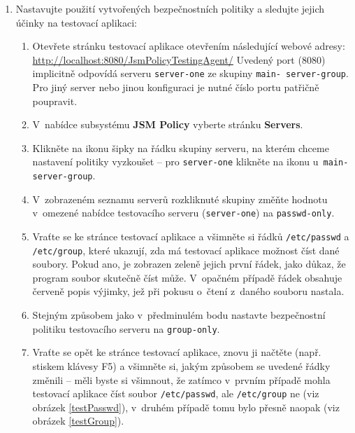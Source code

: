 \begin{enumerate}
  \item Nastavujte použití vytvořených bezpečnostních politiky a sledujte jejich účinky na testovací aplikaci:
  \begin{enumerate}
    \item Otevřete stránku testovací aplikace otevřením následující webové adresy:
      \newline\url{http://localhost:8080/JsmPolicyTestingAgent/}\newline
      Uvedený port (8080) implicitně odpovídá serveru {\tt server-one} ze skupiny {\tt main- server-group}. Pro jiný server nebo jinou konfiguraci je nutné číslo portu patřičně poupravit.
    \item V~nabídce subsystému {\bf JSM Policy} vyberte stránku {\bf Servers}.
    \item Klikněte na ikonu šipky na řádku skupiny serveru, na kterém chceme nastavení politiky vyzkoušet -- pro {\tt server-one} klikněte na ikonu u~{\tt main-server-group}.
    \item V~zobrazeném seznamu serverů rozkliknuté skupiny změňte hodnotu v~omezené nabídce testovacího serveru ({\tt server-one}) na {\tt passwd-only}.
    \item Vraťte se ke stránce testovací aplikace a všimněte si řádků {\tt /etc/passwd} a {\tt /etc/group}, které ukazují, zda má testovací aplikace možnost číst dané soubory. Pokud ano, je zobrazen zeleně jejich první řádek, jako důkaz, že program soubor skutečně číst může. V~opačném případě řádek obsahuje červeně popis výjimky, jež při pokusu o~čtení z~daného souboru nastala.
    \item Stejným způsobem jako v~předminulém bodu nastavte bezpečnostní politiku testovacího serveru na {\tt group-only}.
    \item Vraťte se opět ke stránce testovací aplikace, znovu ji načtěte (např. stiskem klávesy F5) a všimněte si, jakým způsobem se uvedené řádky změnili -- měli byste si všimnout, že zatímco v~prvním případě mohla testovací aplikace číst soubor {\tt /etc/passwd}, ale {\tt /etc/group} ne (viz obrázek \ref{testPasswd}), v~druhém případě tomu bylo přesně naopak (viz obrázek \ref{testGroup}).
  \end{enumerate}
\end{enumerate}

